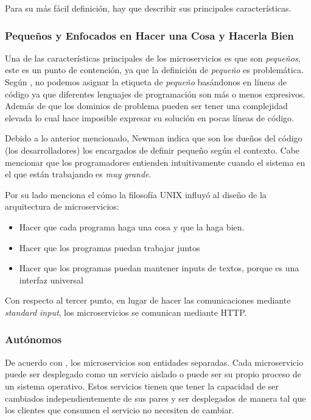 Para su más fácil definición, hay que describir sus principales características.


\subsubsection{Pequeños y Enfocados en Hacer una Cosa y Hacerla Bien}

Una de las características principales de los microservicios es que son {\it pequeños}, este es un
punto de contención, ya que la definición de {\it pequeño} es problemática.
Según \cite{newman2021building}, no podemos asignar la etiqueta de {\it pequeño} basándonos en líneas
de código ya que diferentes lenguajes de programación son más o menos expresivos.
Además de que los dominios de problema pueden ser tener una complejidad elevada lo cual hace imposible
expresar su solución en pocas líneas de código.

Debido a lo anterior mencionado, Newman indica que son los dueños del código (los desarrolladores)
los encargados de definir {pequeño} según el contexto.
Cabe mencionar que los programadores entienden intuitivamente cuando el sistema en el que están trabajando
es {\it muy grande}.

Por su lado \cite{kleppmann2015kafka} menciona el cómo la filosofía UNIX influyó al diseño de la arquitectura
de microservicios:
\begin{itemize}
  \item Hacer que cada programa haga una cosa y que la haga bien.
  \item Hacer que los programas puedan trabajar juntos
  \item Hacer que los programas puedan mantener inputs de textos, porque es una interfaz universal
\end{itemize}

Con respecto al tercer punto, en lugar de hacer las comunicaciones mediante {\it standard input},
los microservicios se comunican mediante HTTP.


\subsubsection{Autónomos}

De acuerdo con \cite{newman2019monolith}, los microservicios son entidades separadas.
Cada microservicio puede ser desplegado como un servicio aislado o puede ser su propio proceso
de un sistema operativo.
Estos servicios tienen que tener la capacidad de ser cambiados independientemente de sus pares
y ser desplegados de manera tal que los clientes que consumen el servicio no necesiten de cambiar.

